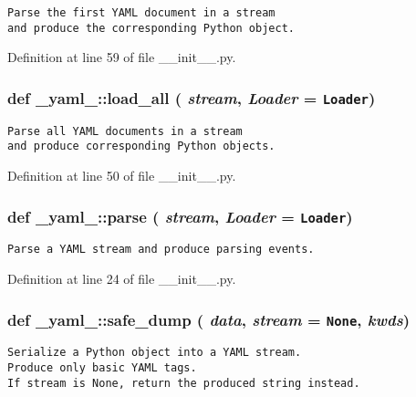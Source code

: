 \footnotesize\begin{verbatim}
Parse the first YAML document in a stream
and produce the corresponding Python object.
\end{verbatim}
\normalsize
 

Definition at line 59 of file \_\-\_\-init\_\-\_\-.py.
\subsubsection{\setlength{\rightskip}{0pt plus 5cm}def \_\-yaml\_\-::load\_\-all ( {\em stream},  {\em Loader} = {\tt Loader})}\label{namespace__yaml___bfe5eeaa793fcfd44ebe9ab591228dc7}




\footnotesize\begin{verbatim}
Parse all YAML documents in a stream
and produce corresponding Python objects.
\end{verbatim}
\normalsize
 

Definition at line 50 of file \_\-\_\-init\_\-\_\-.py.
\subsubsection{\setlength{\rightskip}{0pt plus 5cm}def \_\-yaml\_\-::parse ( {\em stream},  {\em Loader} = {\tt Loader})}\label{namespace__yaml___1e3638cb63e4349eb73eaf0a0dd74792}




\footnotesize\begin{verbatim}
Parse a YAML stream and produce parsing events.
\end{verbatim}
\normalsize
 

Definition at line 24 of file \_\-\_\-init\_\-\_\-.py.
\subsubsection{\setlength{\rightskip}{0pt plus 5cm}def \_\-yaml\_\-::safe\_\-dump ( {\em data},  {\em stream} = {\tt None},  {\em kwds})}\label{namespace__yaml___a83bb1b4e301837ab175950cd0f19c1f}




\footnotesize\begin{verbatim}
Serialize a Python object into a YAML stream.
Produce only basic YAML tags.
If stream is None, return the produced string instead.
\end{verbatim}
\normalsize
 

